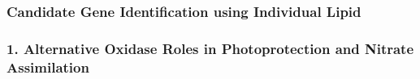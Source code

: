 \documentclass[10pt,letterpaper]{article}
\begin{document}
\begin{itemize}


\subsubsection*{Candidate Gene Identification using Individual Lipid}
\subsubsection*{1. Alternative Oxidase Roles in Photoprotection and Nitrate Assimilation}


\end{itemize}
\end{document}
